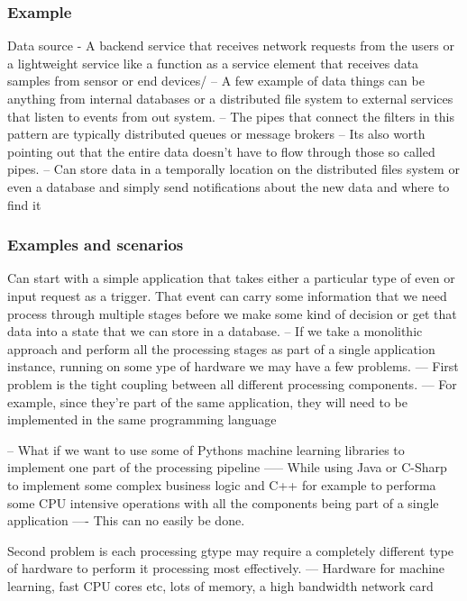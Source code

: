 \documentclass[a4paper, 11pt]{book}
\begin{document}
    \subsubsection{Example}
    Data source - A backend service that receives network requests from the users or a lightweight service like a function as a service element that receives data samples from sensor or end devices/
    -- A few example of data things can be anything from internal databases or a distributed file system to external services that listen to events from out system.
    -- The pipes that connect the filters in this pattern are typically distributed queues or message brokers
    -- Its also worth pointing out that the entire data doesn't have to flow through those so called pipes.
    -- Can store data in a temporally location on the distributed files system or even a database and simply send notifications about the new data and where to find it

    \subsubsection{Examples and scenarios}
    Can start with a simple application that takes either a particular type of even or input request as a trigger.
    That event can carry some information that we need process through multiple stages before we make some kind of decision or get that data into a state that we can store in a database.
    -- If we take a monolithic approach and perform all the processing stages as part of a single application instance, running on some ype of hardware we may have a few problems.
    --- First problem is the tight coupling between all different processing components.
    --- For example, since they're part of the same application, they will need to be implemented in the same programming language

    -- What if we want to use some of Pythons machine learning libraries to implement one part of the processing pipeline
    ----- While using Java or C-Sharp to implement some complex business logic and C++ for example to performa some CPU intensive operations with all the components being part of a single application
    ---- This can no easily be done.

    Second problem is each processing gtype may require a completely different type of hardware to perform it processing most effectively.
    --- Hardware for machine learning, fast CPU cores etc, lots of memory, a high bandwidth network card
\end{document}
